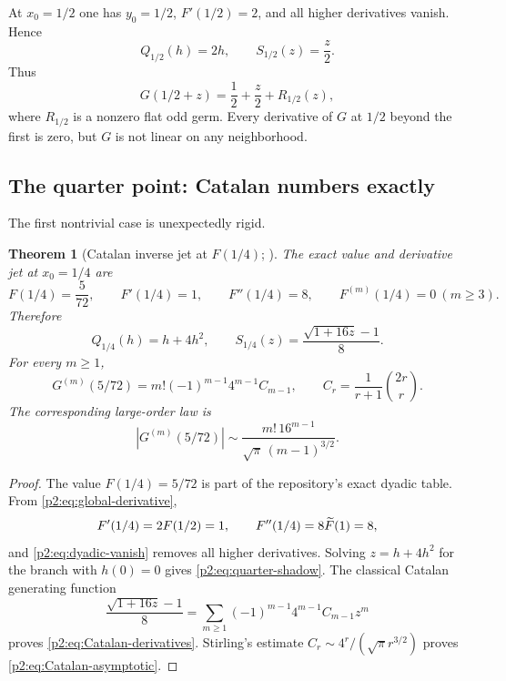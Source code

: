 \documentclass[11pt,oneside]{article}
\numberwithin{equation}{section}
\newtheorem{theorem}{Theorem}[section]
\theoremstyle{definition}
\theoremstyle{remark}
\newcommand{\InvF}{G}
\begin{document}
At $x_0=1/2$ one has $y_0=1/2$, $F'(1/2)=2$, and all higher derivatives vanish.  Hence
\begin{equation}
 Q_{1/2}(h)=2h,
 \qquad
 S_{1/2}(z)=\frac z2.
 \label{p2:eq:midpoint-shadow}
\end{equation}
Thus
\begin{equation}
 \InvF(1/2+z)=\frac12+\frac z2+R_{1/2}(z),
 \label{p2:eq:midpoint-flat}
\end{equation}
where $R_{1/2}$ is a nonzero flat odd germ.  Every derivative of $\InvF$ at $1/2$ beyond the first is
zero, but $\InvF$ is not linear on any neighborhood.

\subsection{The quarter point: Catalan numbers exactly}

The first nontrivial case is unexpectedly rigid.

\begin{theorem}[Catalan inverse jet at $F(1/4)$; \statusnew]
\label{p2:thm:Catalan-quarter}
The exact value and derivative jet at $x_0=1/4$ are
\begin{equation}
 F(1/4)=\frac5{72},
 \qquad F'(1/4)=1,
 \qquad F''(1/4)=8,
 \qquad F^{(m)}(1/4)=0\ (m\ge3).
 \label{p2:eq:quarter-jet}
\end{equation}
Therefore
\begin{equation}
 Q_{1/4}(h)=h+4h^2,
 \qquad
 S_{1/4}(z)=\frac{\sqrt{1+16z}-1}{8}.
 \label{p2:eq:quarter-shadow}
\end{equation}
For every $m\ge1$,
\begin{equation}
 \boxed{
 \InvF^{(m)}(5/72)
 =m!(-1)^{m-1}4^{m-1}C_{m-1},
 \qquad C_r=\frac1{r+1}\binom{2r}{r}.
 }
 \label{p2:eq:Catalan-derivatives}
\end{equation}
The corresponding large-order law is
\begin{equation}
 \left|\InvF^{(m)}(5/72)\right|
 \sim \frac{m!\,16^{m-1}}{\sqrt\pi\,(m-1)^{3/2}}.
 \label{p2:eq:Catalan-asymptotic}
\end{equation}
\end{theorem}

\begin{proof}
The value $F(1/4)=5/72$ is part of the repository's exact dyadic table.  From
\eqref{p2:eq:global-derivative},
\[
 F'(1/4)=2F(1/2)=1,
 \qquad
 F''(1/4)=8\widetilde F(1)=8,
\]
and \eqref{p2:eq:dyadic-vanish} removes all higher derivatives.  Solving
$z=h+4h^2$ for the branch with $h(0)=0$ gives \eqref{p2:eq:quarter-shadow}.  The classical Catalan
generating function
\[
 \frac{\sqrt{1+16z}-1}{8}
 =\sum_{m\ge1}(-1)^{m-1}4^{m-1}C_{m-1}z^m
\]
proves \eqref{p2:eq:Catalan-derivatives}.  Stirling's estimate
$C_r\sim4^r/(\sqrt\pi r^{3/2})$ proves \eqref{p2:eq:Catalan-asymptotic}.
\end{proof}
\end{document}
